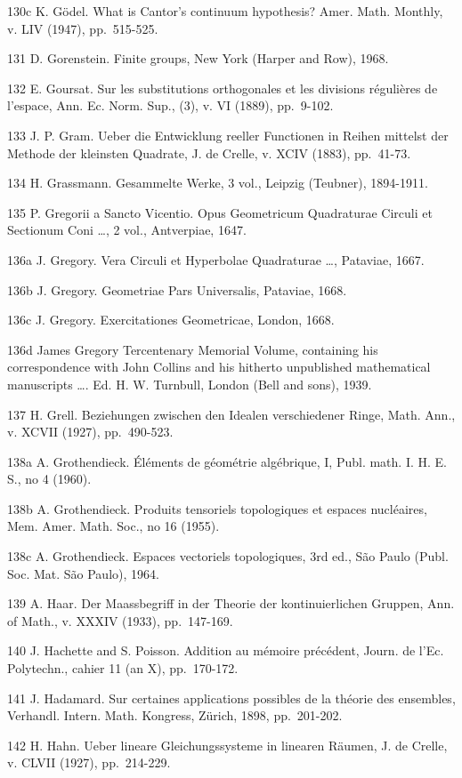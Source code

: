 130c K. Gödel. What is Cantor's continuum hypothesis? Amer. Math. Monthly, v. LIV (1947), pp.~515-525.

131 D. Gorenstein. Finite groups, New York (Harper and Row), 1968.

132 E. Goursat. Sur les substitutions orthogonales et les divisions régulières de l'espace, Ann. Ec. Norm. Sup., (3), v. VI (1889), pp.~9-102.

133 J. P. Gram. Ueber die Entwicklung reeller Functionen in Reihen mittelst der Methode der kleinsten Quadrate, J. de Crelle, v. XCIV (1883), pp.~41-73.

134 H. Grassmann. Gesammelte Werke, 3 vol., Leipzig (Teubner), 1894-1911.

135 P. Gregorii a Sancto Vicentio. Opus Geometricum Quadraturae Circuli et Sectionum Coni \ldots, 2 vol., Antverpiae, 1647.

136a J. Gregory. Vera Circuli et Hyperbolae Quadraturae \ldots, Pataviae, 1667.

136b J. Gregory. Geometriae Pars Universalis, Pataviae, 1668.

136c J. Gregory. Exercitationes Geometricae, London, 1668.

136d James Gregory Tercentenary Memorial Volume, containing his correspondence with John Collins and his hitherto unpublished mathematical manuscripts \ldots. Ed. H. W. Turnbull, London (Bell and sons), 1939.

137 H. Grell. Beziehungen zwischen den Idealen verschiedener Ringe, Math. Ann., v. XCVII (1927), pp.~490-523.

138a A. Grothendieck. Éléments de géométrie algébrique, I, Publ. math. I. H. E. S., no 4 (1960).

138b A. Grothendieck. Produits tensoriels topologiques et espaces nucléaires, Mem. Amer. Math. Soc., no 16 (1955).

138c A. Grothendieck. Espaces vectoriels topologiques, 3rd ed., São Paulo (Publ. Soc. Mat. São Paulo), 1964.

139 A. Haar. Der Maassbegriff in der Theorie der kontinuierlichen Gruppen, Ann. of Math., v. XXXIV (1933), pp.~147-169.

140 J. Hachette and S. Poisson. Addition au mémoire précédent, Journ. de l'Ec. Polytechn., cahier 11 (an X), pp.~170-172.

141 J. Hadamard. Sur certaines applications possibles de la théorie des ensembles, Verhandl. Intern. Math. Kongress, Zürich, 1898, pp.~201-202.

142 H. Hahn. Ueber lineare Gleichungssysteme in linearen Räumen, J. de Crelle, v. CLVII (1927), pp.~214-229.


